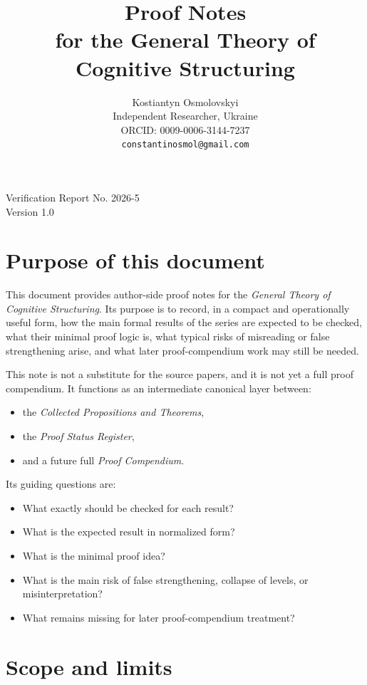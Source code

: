 \documentclass[12pt]{article}
\title{Proof Notes\\
	\small for the General Theory of Cognitive Structuring}
\author{
	Kostiantyn Osmolovskyi\\
	\small Independent Researcher, Ukraine\\
	\small ORCID: 0009-0006-3144-7237\\
	\small \texttt{constantinosmol@gmail.com}
}
\date{}
\begin{document}
	\maketitle

\begin{center}
	\small
	Verification Report No. 2026-5\\
	Version 1.0
\end{center}

\vspace{0.5em}
	
	\section{Purpose of this document}
	
	This document provides author-side proof notes for the \emph{General Theory of Cognitive Structuring}.
	Its purpose is to record, in a compact and operationally useful form, how the main formal results
	of the series are expected to be checked, what their minimal proof logic is, what typical risks
	of misreading or false strengthening arise, and what later proof-compendium work may still be needed.
	
	This note is not a substitute for the source papers, and it is not yet a full proof compendium.
	It functions as an intermediate canonical layer between:
	\begin{itemize}[leftmargin=2em]
		\item the \emph{Collected Propositions and Theorems},
		\item the \emph{Proof Status Register},
		\item and a future full \emph{Proof Compendium}.
	\end{itemize}
	
	Its guiding questions are:
	\begin{itemize}[leftmargin=2em]
		\item What exactly should be checked for each result?
		\item What is the expected result in normalized form?
		\item What is the minimal proof idea?
		\item What is the main risk of false strengthening, collapse of levels, or misinterpretation?
		\item What remains missing for later proof-compendium treatment?
	\end{itemize}
	
	\section{Scope and limits}
	
\end{document}
